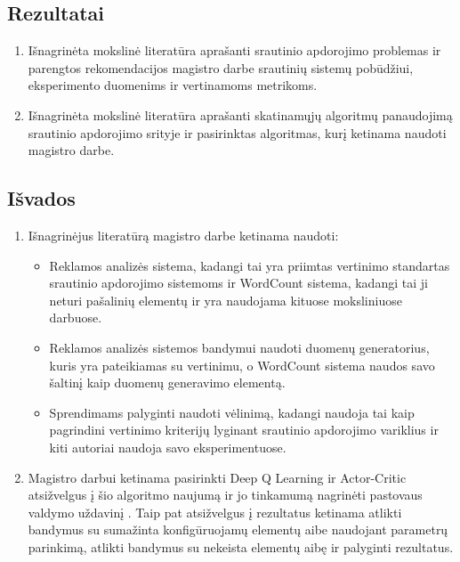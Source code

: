 \documentclass{VUMIFPSbakalaurinis}
\begin{document}
\subsection{Rezultatai}
\begin{enumerate}
    \item Išnagrinėta mokslinė literatūra aprašanti srautinio apdorojimo problemas ir parengtos rekomendacijos magistro darbe srautinių sistemų pobūdžiui, eksperimento duomenims ir vertinamoms metrikoms.
    \item Išnagrinėta mokslinė literatūra aprašanti skatinamųjų algoritmų panaudojimą srautinio apdorojimo srityje ir pasirinktas algoritmas, kurį ketinama naudoti magistro darbe.  
\end{enumerate}

\subsection{Išvados}
\begin{enumerate}
    \item Išnagrinėjus literatūrą magistro darbe ketinama naudoti:
        \begin{itemize}
            \item Reklamos analizės sistema, kadangi tai yra priimtas vertinimo standartas srautinio apdorojimo sistemoms ir WordCount sistema, kadangi tai ji neturi pašalinių elementų ir yra naudojama kituose moksliniuose darbuose.
            \item Reklamos analizės sistemos bandymui naudoti \cite{Chintapalli2016Benchmarking} duomenų generatorius, kuris yra pateikiamas su vertinimu, o WordCount sistema naudos savo šaltinį kaip duomenų generavimo elementą.
            \item Sprendimams palyginti naudoti vėlinimą, kadangi \cite{Chintapalli2016Benchmarking} naudoja tai kaip pagrindini vertinimo kriterijų lyginant srautinio apdorojimo variklius ir kiti autoriai naudoja savo eksperimentuose.  
        \end{itemize}
    \item Magistro darbui ketinama pasirinkti Deep Q Learning ir Actor-Critic atsižvelgus į šio algoritmo naujumą ir jo tinkamumą nagrinėti pastovaus valdymo uždavinį \cite{Silver2014Deterministic}. Taip pat atsižvelgus į \cite{vaquero2018autotuning, herodotou2020survey} rezultatus ketinama atlikti bandymus su sumažinta konfigūruojamų elementų aibe naudojant parametrų parinkimą, atlikti bandymus su nekeista elementų aibę ir palyginti rezultatus.
\end{enumerate}

\printbibliography[heading=bibintoc] 
\end{document}

